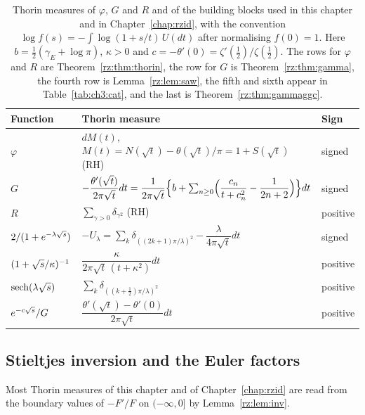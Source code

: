 \begin{table}[htbp]
\centering
\small
\begin{tabular}{lll}
\toprule
Function & Thorin measure & Sign\\
\midrule
$\varphi$ & $dM(t)$, $M(t)=N(\sqrt t)-\theta(\sqrt t)/\pi=1+S(\sqrt t)$ (RH) & signed\\
$G$ & $-\dfrac{\theta'(\sqrt t)}{2\pi\sqrt t}dt=\dfrac{1}{2\pi\sqrt t}\Bigl\{b+\sum_{n\ge0}\Bigl(\dfrac{c_n}{t+c_n^2}-\dfrac1{2n+2}\Bigr)\Bigr\}dt$ & signed\\
$R$ & $\sum_{\gamma>0}\delta_{\gamma^2}$ (RH) & positive\\
\midrule
$2/(1+e^{-\lambda\sqrt{s}})$ & $-U_\lambda=\sum_k\delta_{((2k+1)\pi/\lambda)^2}-\dfrac{\lambda}{4\pi\sqrt t}dt$ & signed\\
$(1+\sqrt{s}/\kappa)^{-1}$ & $\dfrac{\kappa}{2\pi\sqrt t\,(t+\kappa^2)}dt$ & positive\\
$\operatorname{sech}(\lambda\sqrt{s})$ & $\sum_k\delta_{((k+\frac12)\pi/\lambda)^2}$ & positive\\
$e^{-c\sqrt{s}}/G$ & $\dfrac{\theta'(\sqrt t)-\theta'(0)}{2\pi\sqrt t}dt$ & positive\\
\bottomrule
\end{tabular}
\caption{Thorin measures of $\varphi$, $G$ and $R$ and of the building blocks used in this chapter and in Chapter~\ref{chap:rzid}, with the convention $\log f(s)=-\int\log(1+s/t)\,U(dt)$ after normalising $f(0)=1$. Here $b=\frac12(\gamma_E+\log\pi)$, $\kappa>0$ and $c=-\theta'(0)=\zeta'(\frac12)/\zeta(\frac12)$. The rows for $\varphi$ and $R$ are Theorem~\ref{rz:thm:thorin}, the row for $G$ is Theorem~\ref{rz:thm:gamma}, the fourth row is Lemma~\ref{rz:lem:saw}, the fifth and sixth appear in Table~\ref{tab:ch3:cat}, and the last is Theorem~\ref{rz:thm:gammaggc}.}
\label{rz:tab:measures}
\end{table}

\subsection{Stieltjes inversion and the Euler factors}\label{rz:sec:prelim}

Most Thorin measures of this chapter and of Chapter~\ref{chap:rzid} are read from the boundary values of $-F'/F$ on $(-\infty,0]$ by Lemma~\ref{rz:lem:inv}.

